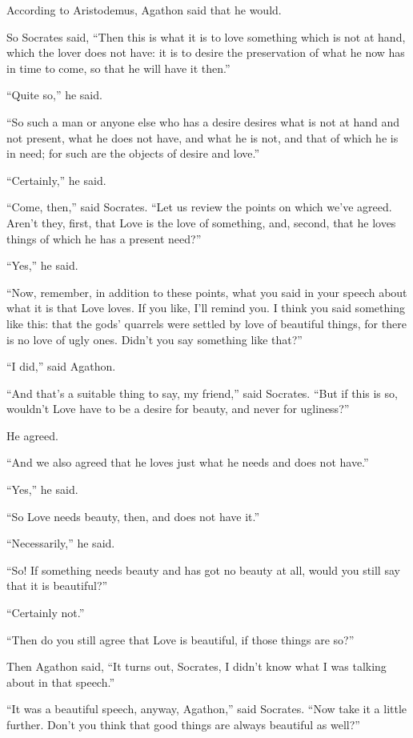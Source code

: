 According to Aristodemus, Agathon said that he would.

So Socrates said, “Then this is what it is to love something which is
not at hand, which the lover does not have: it is to desire the
preservation of what he now has in time to come, so that he will have it
then.” 

“Quite so,” he said.

“So such a man or anyone else who has a desire desires what is not at
hand and not present, what he does not have, and what he is not, and
that of which he is in need; for such are the objects of desire and
love.”

“Certainly,” he said.

“Come, then,” said Socrates. “Let us review the points on which we’ve
agreed. Aren’t they, first, that Love is the love of something, and,
second, that he loves things of which he has a present need?”

“Yes,” he said.

“Now, remember, in addition to these points, what you said in your
speech about what it is that Love loves. If you like, I’ll remind you. I
think you said something like this: that the gods’ quarrels were settled
by love of beautiful things, for there is no love of ugly
ones. Didn’t you say
something like that?”

“I did,” said Agathon.

“And that’s a suitable thing to say, my friend,” said Socrates. “But if
this is so, wouldn’t Love have to be a desire for beauty, and never for
ugliness?”

He agreed. 

“And we also agreed that he loves just what he needs and does not have.”

“Yes,” he said.

“So Love needs beauty, then, and does not have it.”

“Necessarily,” he said.

“So! If something needs beauty and has got no beauty at all, would you
still say that it is beautiful?”

“Certainly not.”

“Then do you still agree that Love is beautiful, if those things are
so?”

 Then Agathon said, “It turns out, Socrates, I didn’t know what I
was talking about in that speech.”

“It was a beautiful speech, anyway, Agathon,” said Socrates. “Now take
it a little further. Don’t you think that good things are always
beautiful as well?”

